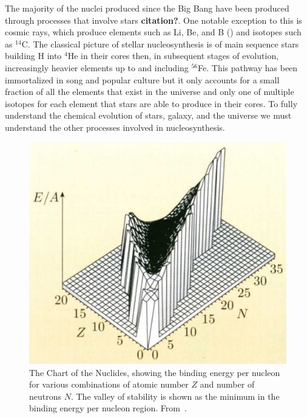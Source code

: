 \label{sec:nuc}

The majority of the nuclei produced since the Big Bang have been
produced through processes that involve stars {\bf citation?}.  One
notable exception to this is cosmic rays, which produce elements such
as Li, Be, and B (\citealt{meneguzzi1971}) and isotopes such as
$^{14}$C.  The classical picture of stellar nucleosynthesis is of main
sequence stars
building H into $^4$He in their cores then, in subsequent stages of
evolution, increasingly heavier elements up to and including
$^{56}$Fe. This pathway has been immortalized in song and popular
culture but it only accounts for a small fraction of all the elements
that exist in the universe and only one of multiple isotopes for each
element that stars are able to produce in their cores.  To fully
understand the chemical evolution of stars, galaxy, and the universe
we must understand the other processes involved in nucleosynthesis.

\begin{figure}
\includegraphics[width=\linewidth]{pdf/con.png}
\caption{\label{fig:con} The Chart of the Nuclides, showing the
  binding energy per nucleon for various combinations of atomic number
  $Z$ and number of neutrons $N$.  The valley of stability is shown as
  the minimum in the binding energy per nucleon region. From~\cite{ryan2010}.}
\end{figure}

